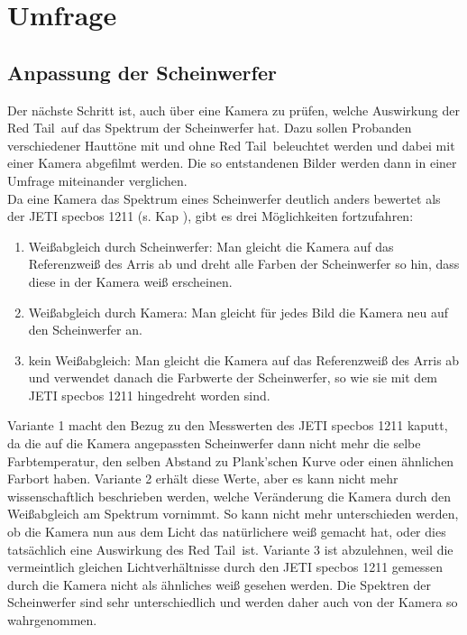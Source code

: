 \chapter{Umfrage}

\section{Anpassung der Scheinwerfer}
\label{sec_anpassunglampen}
Der nächste Schritt ist, auch über eine Kamera zu prüfen, welche Auswirkung der \glqq Red Tail\grqq\ auf das Spektrum der Scheinwerfer hat. Dazu sollen Probanden verschiedener Hauttöne mit und ohne \glqq Red Tail\grqq\ beleuchtet werden und dabei mit einer Kamera abgefilmt werden. Die so entstandenen Bilder werden dann in einer Umfrage miteinander verglichen.\\
Da eine Kamera das Spektrum eines Scheinwerfer deutlich anders bewertet als der JETI specbos 1211 (s. Kap ), gibt es drei Möglichkeiten fortzufahren:

\begin{enumerate}\setlength{\itemsep}{0ex}
\item Weißabgleich durch Scheinwerfer: Man gleicht die Kamera auf das Referenzweiß des Arris ab und dreht alle Farben der Scheinwerfer so hin, dass diese in der Kamera weiß erscheinen.
\item Weißabgleich durch Kamera: Man gleicht für jedes Bild die Kamera neu auf den Scheinwerfer an.
\item kein Weißabgleich: Man gleicht die Kamera auf das Referenzweiß des Arris ab und verwendet danach die Farbwerte der Scheinwerfer, so wie sie mit dem JETI specbos 1211 hingedreht worden sind.
\end{enumerate}

Variante 1 macht den Bezug zu den Messwerten des JETI specbos 1211 kaputt, da die auf die Kamera angepassten Scheinwerfer dann nicht mehr die selbe Farbtemperatur, den selben Abstand zu Plank'schen Kurve oder einen ähnlichen Farbort haben. Variante 2 erhält diese Werte, aber es kann nicht mehr wissenschaftlich beschrieben werden, welche Veränderung die Kamera durch den Weißabgleich am Spektrum vornimmt. So kann nicht mehr unterschieden werden, ob die Kamera nun aus dem Licht das natürlichere weiß gemacht hat, oder dies tatsächlich eine Auswirkung des \glqq Red Tail\grqq\ ist.
Variante 3 ist abzulehnen, weil die vermeintlich gleichen Lichtverhältnisse durch den JETI specbos 1211 gemessen durch die Kamera nicht als ähnliches weiß gesehen werden. Die Spektren der Scheinwerfer sind sehr unterschiedlich und werden daher auch von der Kamera so wahrgenommen.

